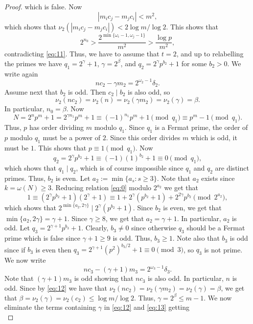 \documentclass[10pt,a4paper]{amsart}
\begin{document}
\begin{proof}
which is false. Now 
$$
|m_ic_j-m_jc_i|<m^2,
$$
which shows that $\nu_2(|m_ic_j-m_jc_i|)<2\log m/\log 2$. This shows that 
$$
2^{n_0}> \frac{2^{\min\{\omega_i-1,\omega_j-1\}}}{m^2}>\frac{\log p}{m^2},
$$
contradicting \eqref{eq:11}. Thus, we have to assume that $t=2$, and up to relabelling the primes we have $q_1=2^{\gamma}+1$, $\gamma=2^{\beta}$, and $q_2=2^{\gamma}p^{b_2}+1$ for some $b_2>0$. We write again 
\begin{equation}
\label{eq:12}
nc_2-\gamma m_2=2^{\omega_2-1}\delta_2.
\end{equation}
Assume next that $b_2$ is odd. Then $c_2\mid b_2$ is also odd, so 
$$
\nu_2(nc_2)=\nu_2(n)=\nu_2(\gamma m_2)=\nu_2(\gamma)=\beta.
$$ 
In particular, $n_0=\beta$. Now 
$$
N=2^np^m+1=2^{\gamma n_1} p^m+1\equiv (-1)^{n_1} p^m+1\pmod {q_1}\equiv p^m-1\pmod {q_1}.
$$
Thus, $p$ has order dividing $m$ modulo $q_1$. Since $q_1$ is a Fermat prime, the order of $p$ modulo $q_1$ must be a power of $2$. Since this order divides $m$ which is odd, it must be $1$. This shows that $p\equiv 1\pmod {q_1}$. Now 
$$
q_2=2^{\gamma}p^{b_2}+1\equiv (-1) (1)^{b_2}+1\equiv 0\pmod {q_1},
$$
which shows that $q_1\mid q_2$, which is of course impossible since $q_1$ and $q_2$ are distinct primes. Thus, $b_2$ is even. Let $a_2:=\min\{a_{s}: s\ge 3\}$. Note that $a_2$ exists since 
$k=\omega(N)\ge 3$. Reducing relation \eqref{eq:0} modulo $2^{a_2}$ we get that
$$
1\equiv (2^{\gamma}p^{b_2}+1)(2^{\gamma}+1)\equiv 1+2^{\gamma}(p^{b_2}+1)+2^{2\gamma}p^{b_2}\pmod {2^{a_2}},
$$
which shows that $2^{\min\{a_2,2\gamma\}}\mid 2^{\gamma}(p^{b_2}+1)$. Since $b_2$ is even, we get that $\min\{a_2,2\gamma\}=\gamma+1$. Since $\gamma\ge 8$, we get that $a_2=\gamma+1$. In particular, 
$a_2$ is odd. Let $q_3=2^{\gamma+1}p^{b_3}+1$. Clearly, $b_3\ne 0$ since otherwise $q_3$ should be a Fermat prime which is false since $\gamma+1\ge 9$ is odd. Thus, $b_3\ge 1$. Note also that $b_3$ is odd since
if $b_3$ is even then $q_3=2^{\gamma+1}(p^2)^{b_3/2}+1\equiv 0\pmod 3$, so $q_3$ is not prime. We now write 
\begin{equation}
\label{eq:13}
nc_3-(\gamma+1)m_3=2^{\omega_3-1}\delta_3.
\end{equation}
Note that $(\gamma+1)m_3$ is odd showing that $nc_3$ is also odd. In particular, $n$ is odd. Since by \eqref{eq:12} we have that $\nu_2(nc_2)=\nu_2(\gamma m_2)=\nu_2(\gamma)=\beta$, we get that 
$\beta=\nu_2(\gamma)=\nu_2(c_2)\le \log m/\log 2$. Thus, $\gamma=2^{\beta}\le m-1$. We now eliminate the terms containing $\gamma$ in \eqref{eq:12} and \eqref{eq:13} getting 
\begin{equation}

\end{equation}
\end{proof}
\end{document}
